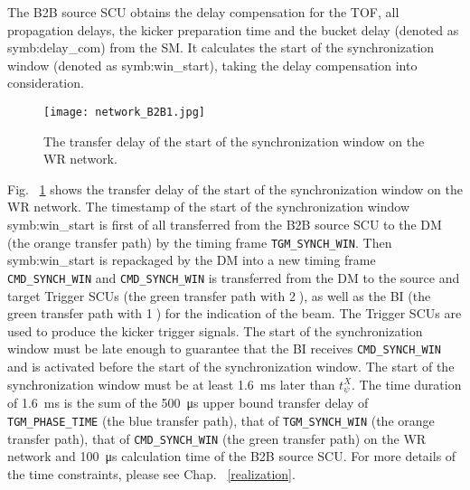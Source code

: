 The B2B source SCU obtains the delay compensation for the TOF, all propagation delays, the kicker preparation time and the bucket delay (denoted as \gls{symb:delay_com}) from the SM. It calculates the start of the synchronization window (denoted as \gls{symb:win_start}), taking the delay compensation into consideration. 

 \begin{figure}[!htb]
   \centering   
   \texttt{[image: network\_B2B1.jpg]}
   \caption{The transfer delay of the start of the synchronization window on the WR network.}
   \label{network_B2B1}
\end{figure}
Fig. ~\ref{network_B2B1} shows the transfer delay of the start of the synchronization window on the WR network. The timestamp of the start of the synchronization window \gls{symb:win_start} is first of all transferred from the B2B source SCU to the DM (the orange transfer path) by the timing frame \verb|TGM_SYNCH_WIN|. Then \gls{symb:win_start} is repackaged by the DM into a new timing frame \verb|CMD_SYNCH_WIN| and \verb|CMD_SYNCH_WIN| is transferred from the DM to the source and target Trigger SCUs  (the green transfer path with \textcircled{2}), as well as the BI (the green transfer path with \textcircled{1}) for the indication of the beam. The Trigger SCUs are used to produce the kicker trigger signals. The start of the synchronization window must be late enough to guarantee that the BI receives \verb|CMD_SYNCH_WIN| and is activated before the start of the synchronization window. The start of the synchronization window must be at least \SI{1.6}{\ms} later than $t_\psi^\mathit{X}$. The time duration of \SI{1.6}{\ms} is the sum of the \SI{500}{\us} upper bound transfer delay of \verb|TGM_PHASE_TIME| (the blue transfer path), that of \verb|TGM_SYNCH_WIN| (the orange transfer path), that of \verb|CMD_SYNCH_WIN| (the green transfer path) on the WR network and \SI{100}{\us} calculation time of the B2B source SCU. For more details of the time constraints, please see Chap. ~\ref{realization}.

